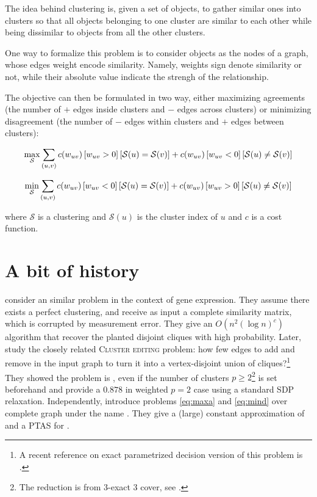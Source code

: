 The idea behind clustering is, given a set of objects, to gather similar ones
into clusters so that all objects belonging to one cluster are similar to each
other while being dissimilar to objects from all the other clusters.

One way to formalize this problem is to consider objects as the nodes of a
graph, whose edges weight encode similarity. Namely, weights sign denote
similarity or not, while their absolute value indicate the strengh of the
relationship. 

The objective can then be formulated in two way, either maximizing agreements
(the number of $+$ edges inside clusters and $-$ edges across clusters) or
minimizing disagreement (the number of $-$ edges within clusters and $+$ edges
between clusters):

\maxa{}
\begin{equation}
		\max_{\mathcal{S}} \sum_{(u,v)}
		c(w_{uv}) \left[w_{uv}>0\right] \left[\mathcal{S}(u) = \mathcal{S}(v)\right] +
		c(w_{uv}) \left[w_{uv}<0\right] \left[\mathcal{S}(u) \neq \mathcal{S}(v)\right]
		\label{eq:maxa}
\end{equation}

\mind{}
\begin{equation}
		\min_{\mathcal{S}} \sum_{(u,v)}
		c(w_{uv}) \left[w_{uv}<0\right] \left[\mathcal{S}(u) = \mathcal{S}(v)\right] +
		c(w_{uv}) \left[w_{uv}>0\right] \left[\mathcal{S}(u) \neq \mathcal{S}(v)\right]
		\label{eq:mind}
\end{equation}

where $\mathcal{S}$ is a clustering and $\mathcal{S}(u)$ is the cluster index
of $u$ and $c$ is a cost function.

\section{A bit of history}
\label{sub:histo}

\Textcite{Ben-Dor99} consider an similar problem in the context of gene
expression.  They assume there exists a perfect clustering, and receive as
input a complete similarity matrix, which is corrupted by measurement error.
They give an $O(n^2(\log n)^c)$ algorithm that recover the planted disjoint
cliques with high probability.
Later, \textcite{Shamir02} study the closely related \textsc{Cluster editing}
problem: how few edges to add and remove in the input graph to turn it into a
vertex-disjoint union of cliques?\footnote{A recent reference on exact
parametrized decision version of this problem is \autocite{Fomin2014}.} They
showed the problem is \npc{}, even if
the number of clusters $p\geq2$\footnote{The reduction is from 3-exact 3 cover,
see \autocite[Theorems 1, 2 and Corollary 1]{Shamir02}.} is set beforehand
and provide a $0.878$ in weighted $p=2$ case using a standard SDP relaxation.
Independently, \textcite{Bansal2002} introduce problems \eqref{eq:maxa} and
\eqref{eq:mind} over complete graph under the name \pcc{}. They give a (large)
constant approximation of \mind{} and a PTAS for \maxa{}.

